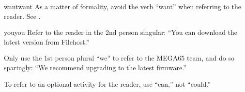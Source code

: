 \begin{sgentry}{want}{want}
    As a matter of formality, avoid the verb ``want'' when referring to the reader. See .
\end{sgentry}

\begin{sgentry}{you}{you}
    Refer to the reader in the 2nd person singular: ``You can download the latest version from Filehost.''

    Only use the 1st person plural ``we'' to refer to the MEGA65 team, and do so sparingly: ``We recommend upgrading to the latest firmware.''

    To refer to an optional activity for the reader, use ``can,'' not ``could.''
\end{sgentry}




